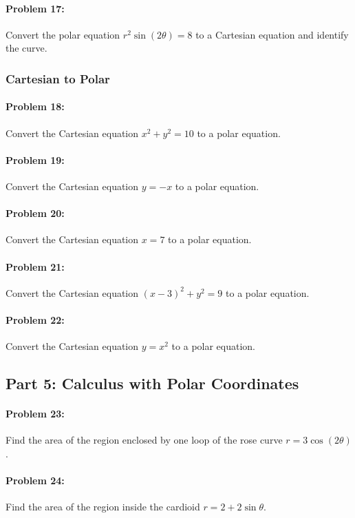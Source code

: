 \documentclass{article}
\begin{document}
\paragraph{Problem 17:} Convert the polar equation $r^2\sin(2\theta) = 8$ to a Cartesian equation and identify the curve.

\subsubsection*{Cartesian to Polar}

\paragraph{Problem 18:} Convert the Cartesian equation $x^2 + y^2 = 10$ to a polar equation.

\paragraph{Problem 19:} Convert the Cartesian equation $y = -x$ to a polar equation.

\paragraph{Problem 20:} Convert the Cartesian equation $x=7$ to a polar equation.

\paragraph{Problem 21:} Convert the Cartesian equation $(x-3)^2 + y^2 = 9$ to a polar equation.

\paragraph{Problem 22:} Convert the Cartesian equation $y = x^2$ to a polar equation.

\subsection*{Part 5: Calculus with Polar Coordinates}

\paragraph{Problem 23:} Find the area of the region enclosed by one loop of the rose curve $r = 3\cos(2\theta)$.

\paragraph{Problem 24:} Find the area of the region inside the cardioid $r = 2 + 2\sin\theta$.
\end{document}
